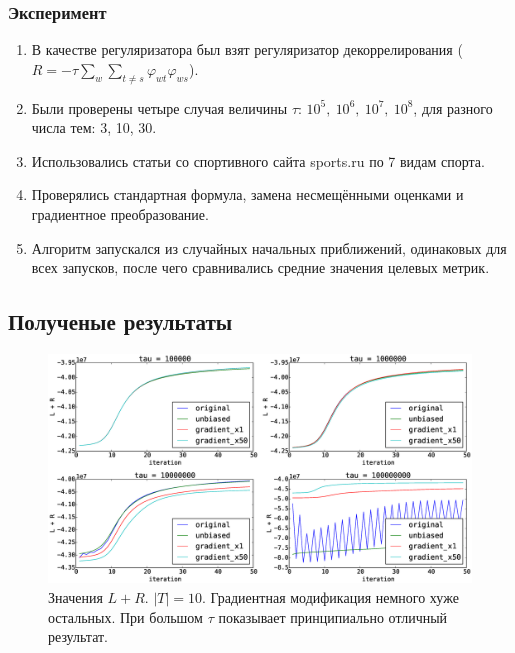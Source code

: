 \documentclass[utf8]{beamer}
\renewcommand{\phi}{\varphi}
\begin{document}
\begin{frame}
\frametitle{Эксперимент}
		
\begin{enumerate}
\item В качестве регуляризатора был взят регуляризатор декоррелирования ($R = -\tau\sum\limits_w \sum\limits_{t \neq s} \phi_{wt} \phi_{ws}$).
\item Были проверены четыре случая величины $\tau$: $10^5,~10^6,~10^7,~10^8$, для разного числа тем: 3, 10, 30.
\item Использовались статьи со спортивного сайта sports.ru по 7 видам спорта.
\item Проверялись стандартная формула, замена несмещёнными оценками и градиентное преобразование.
\item Алгоритм  запускался из случайных начальных приближений, одинаковых для всех запусков, после чего сравнивались средние значения целевых метрик.
\end{enumerate}
\end{frame}

\subsection{Полученые результаты}
\captionsetup{labelformat=simple} 
\begin{frame}
\begin{figure}[h]
	\centering  	
	\caption{Значения $L + R$. $|T| = 10$. Градиентная модификация немного хуже остальных. При большом $\tau$ показывает принципиально отличный результат.} 
	\medskip
	\includegraphics[width=0.9\linewidth]{presentation_pictures/topics_10_LR_values.eps}  
\end{figure}
\end{frame}
\end{document}
